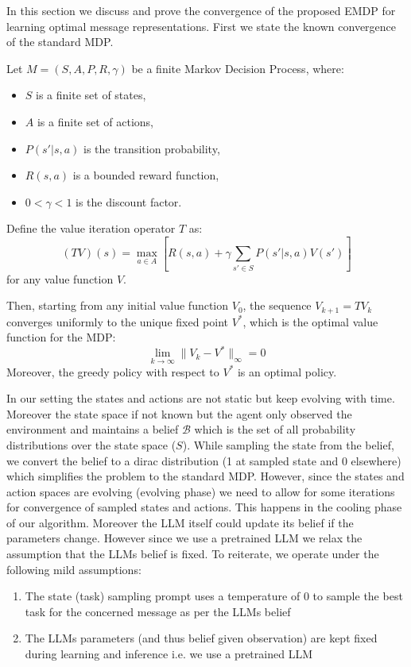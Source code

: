 In this section we discuss and prove the convergence of the proposed EMDP for learning optimal message representations. First we state the known convergence of the standard MDP.

\begin{lemma}\label{lemma_mdp_convergence}

Let $M = (S, A, P, R, \gamma)$ be a finite Markov Decision Process, where:
\begin{itemize}
    \item $S$ is a finite set of states,
    \item $A$ is a finite set of actions,
    \item $P(s'|s, a)$ is the transition probability,
    \item $R(s, a)$ is a bounded reward function,
    \item $0 < \gamma < 1$ is the discount factor.
\end{itemize}

Define the value iteration operator $T$ as:
\[
(TV)(s) = \max_{a \in A} \left[ R(s, a) + \gamma \sum_{s' \in S} P(s'|s, a) V(s') \right]
\]
for any value function $V$.

Then, starting from any initial value function $V_0$, the sequence $V_{k+1} = T V_k$ converges uniformly to the unique fixed point $V^*$, which is the optimal value function for the MDP:
\[
\lim_{k \to \infty} \| V_k - V^* \|_\infty = 0
\]
Moreover, the greedy policy with respect to $V^*$ is an optimal policy.
\end{lemma}

In our setting the states and actions are not static but keep evolving with time. Moreover the state space if not known but the agent only observed the environment and maintains a belief $\mathcal{B}$ which is the set of all probability distributions over the state space ($S$). While sampling the state from the belief, we convert the belief to a dirac distribution (1 at sampled state and 0 elsewhere) which simplifies the problem to the standard MDP. However, since the states and action spaces are evolving (evolving phase) we need to allow for some iterations for convergence of sampled states and actions. This happens in the cooling phase of our algorithm. Moreover the LLM itself could update its belief if the parameters change. However since we use a pretrained LLM we relax the assumption that the LLMs belief is fixed. To reiterate, we operate under the following mild assumptions:
\begin{enumerate}
\item The state (task) sampling prompt uses a temperature of 0 to sample the best task for the concerned message as per the LLMs belief
\item The LLMs parameters (and thus belief given observation) are kept fixed during learning and inference i.e. we use a pretrained LLM
\end{enumerate}

